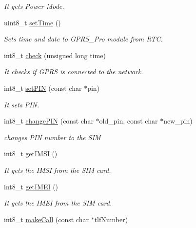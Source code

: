 \begin{DoxyCompactItemize}
\begin{DoxyCompactList}\small\item\em It gets Power Mode. \end{DoxyCompactList}\item 
uint8\+\_\+t \hyperlink{class_wasp_g_p_r_s___pro__core_acc76eed7a4aedac4f9cd3bf20b974f16}{set\+Time} ()
\begin{DoxyCompactList}\small\item\em Sets time and date to G\+P\+R\+S\+\_\+\+Pro module from R\+TC. \end{DoxyCompactList}\item 
int8\+\_\+t \hyperlink{class_wasp_g_p_r_s___pro__core_a9bd2496ac41cd4aa13e5cd1023d35f44}{check} (unsigned long time)
\begin{DoxyCompactList}\small\item\em It checks if G\+P\+RS is connected to the network. \end{DoxyCompactList}\item 
int8\+\_\+t \hyperlink{class_wasp_g_p_r_s___pro__core_a06cfe4943b776df22f42d76637eb5405}{set\+P\+IN} (const char $\ast$pin)
\begin{DoxyCompactList}\small\item\em It sets P\+IN. \end{DoxyCompactList}\item 
int8\+\_\+t \hyperlink{class_wasp_g_p_r_s___pro__core_a5446bbc65535e2d49b0d6150622613e0}{change\+P\+IN} (const char $\ast$old\+\_\+pin, const char $\ast$new\+\_\+pin)
\begin{DoxyCompactList}\small\item\em changes P\+IN number to the S\+IM \end{DoxyCompactList}\item 
int8\+\_\+t \hyperlink{class_wasp_g_p_r_s___pro__core_a2352de6378f424b47f619b8e8447e9f7}{get\+I\+M\+SI} ()
\begin{DoxyCompactList}\small\item\em It gets the I\+M\+SI from the S\+IM card. \end{DoxyCompactList}\item 
int8\+\_\+t \hyperlink{class_wasp_g_p_r_s___pro__core_a942a8ab9572e99d576058e2a87cd0ba3}{get\+I\+M\+EI} ()
\begin{DoxyCompactList}\small\item\em It gets the I\+M\+EI from the S\+IM card. \end{DoxyCompactList}\item 
int8\+\_\+t \hyperlink{class_wasp_g_p_r_s___pro__core_afff6f4bab5d38195b86665e19df060c1}{make\+Call} (const char $\ast$tlf\+Number)

\end{DoxyCompactItemize}
